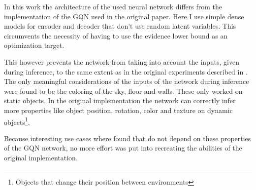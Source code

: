 In this work the architecture of the used neural network differs from the implementation of the GQN used in the original paper. Here I use simple dense models for encoder and decoder that don't use random latent variables. This circumvents the necessity of having to use the evidence lower bound as an optimization target.

This however prevents the network from taking into account the inputs, given during inference, to the same extent as in the original experiments described in \cite{gqn}. The only meaningful considerations of the inputs of the network during inference were found to be the coloring of the sky, floor and walls. These only worked on static objects. In the original implementation the network can correctly infer more properties like object position, rotation, color and texture on dynamic objects\footnote{Objects that change their position between environments}.

Because interesting use cases where found that do not depend on these properties of the GQN network, no more effort was put into recreating the abilities of the original implementation.
